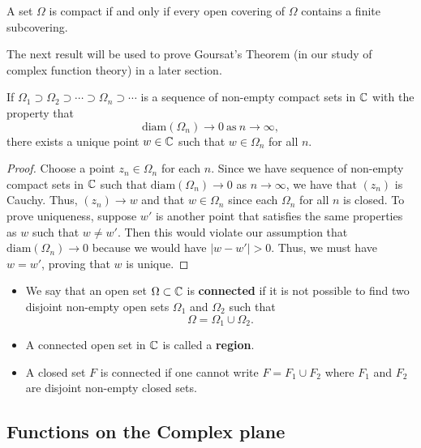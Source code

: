 \documentclass[11pt,a4paper]{book}
\begin{document}
\begin{theorem}[ ]
   A set \( \Omega  \) is compact if and only if every open covering of \( \Omega  \) contains a finite subcovering. 
\end{theorem}

The next result will be used to prove Goursat's Theorem (in our study of complex function theory) in a later section.

\begin{prop}
    If \( {\Omega}_{1} \supset {\Omega}_{2} \supset \cdots \supset {\Omega}_{n} \supset \cdots  \) is a sequence of non-empty compact sets in \( \mathbb{C}  \) with the property that 
    \[  \text{diam}({\Omega}_{n}) \to 0 \ \text{as} \ n \to \infty,  \]
    there exists a unique point \( w \in \mathbb{C}  \) such that \( w \in {\Omega}_{n} \) for all \( n  \).
\end{prop}
\begin{proof}
    Choose a point \( {z}_{n} \in {\Omega}_{n}  \) for each \( n  \). Since we have sequence of non-empty compact sets in \( \mathbb{C}  \) such that \( \text{diam}(\Omega_n) \to 0  \) as \( n \to \infty  \), we have that \( ({z}_{n})   \) is Cauchy. Thus, \( ({z}_{n}) \to w  \) and that \( w \in {\Omega}_{n} \) since each \( {\Omega}_{n} \) for all \( n \) is closed. To prove uniqueness, suppose \( w' \) is another point that satisfies the same properties as \( w  \) such that \( w \neq w' \). Then this would violate our assumption that \( \text{diam}({\Omega}_{n}) \to 0  \) because we would have \( | w - w' | > 0  \). Thus, we must have \( w = w' \), proving that \( w  \) is unique.
\end{proof}  

\begin{itemize}
    \item We say that an open set \( \Omega \subset \mathbb{C}  \) is \textbf{connected} if it is not possible to find two disjoint non-empty open sets \( {\Omega}_{1}  \) and \( {\Omega}_{2} \) such that
        \[  \Omega = {\Omega}_{1} \cup {\Omega}_{2}. \]
    \item A connected open set in \( \mathbb{C}  \) is called a \textbf{region}.
    \item A closed set \( F  \) is connected if one cannot write \( F = {F}_{1} \cup {F}_{2} \) where \( {F}_{1} \) and \( {F}_{2} \) are disjoint non-empty closed sets. 
\end{itemize}

\subsection{Functions on the Complex plane}
\end{document}
